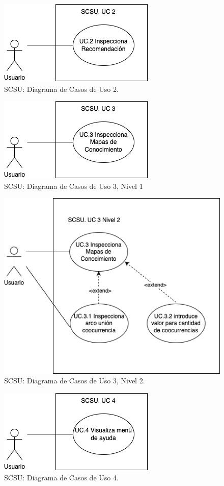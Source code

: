 \documentclass[
  12pt,
  openany]{book}
\begin{document}
\begin{figure}

{\centering \includegraphics[width=0.4\linewidth]{images/05-desarrollo/4_ciclo/UC/SCSU_UC2_nivel1} 

}

\caption{SCSU: Diagrama de Casos de Uso 2.}\label{fig:uc2}
\end{figure}

\begin{figure}

{\centering \includegraphics[width=0.4\linewidth]{images/05-desarrollo/4_ciclo/UC/SCSU_UC3_nivel1} 

}

\caption{SCSU: Diagrama de Casos de Uso 3, Nivel 1}\label{fig:uc3}
\end{figure}

\begin{figure}

{\centering \includegraphics[width=0.5\linewidth]{images/05-desarrollo/4_ciclo/UC/SCSU_UC3_nivel2} 

}

\caption{SCSU: Diagrama de Casos de Uso 3, Nivel 2.}\label{fig:uc31}
\end{figure}

\begin{figure}

{\centering \includegraphics[width=0.4\linewidth]{images/05-desarrollo/4_ciclo/UC/SCSU_UC4} 

}

\caption{SCSU: Diagrama de Casos de Uso 4.}\label{fig:uc4}
\end{figure}
\end{document}
